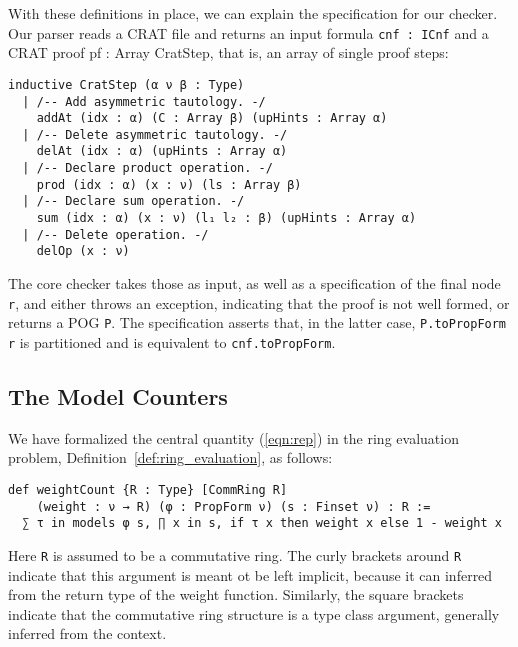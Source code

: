 With these definitions in place, we can explain the specification for our checker.
Our parser reads a CRAT file and returns an input formula \lstinline{cnf : ICnf} and a
CRAT proof {pf : Array CratStep}, that is, an array of single proof steps:
\begin{lstlisting}
inductive CratStep (α ν β : Type)
  | /-- Add asymmetric tautology. -/
    addAt (idx : α) (C : Array β) (upHints : Array α)
  | /-- Delete asymmetric tautology. -/
    delAt (idx : α) (upHints : Array α)
  | /-- Declare product operation. -/
    prod (idx : α) (x : ν) (ls : Array β)
  | /-- Declare sum operation. -/
    sum (idx : α) (x : ν) (l₁ l₂ : β) (upHints : Array α)
  | /-- Delete operation. -/
    delOp (x : ν)
\end{lstlisting}
The core checker takes those as input, as well as a specification of the final node \lstinline{r},
and either throws an exception, indicating that the proof is not well formed,
or returns a POG \lstinline{P}.
The specification asserts that, in the latter case, \lstinline{P.toPropForm r} is partitioned
and is equivalent to \lstinline{cnf.toPropForm}.

\subsection{The Model Counters}

We have formalized the central quantity (\ref{eqn:rep}) in the ring evaluation problem,
Definition~\ref{def:ring_evaluation}, as follows:
\begin{lstlisting}
def weightCount {R : Type} [CommRing R]
    (weight : ν → R) (φ : PropForm ν) (s : Finset ν) : R :=
  ∑ τ in models φ s, ∏ x in s, if τ x then weight x else 1 - weight x
\end{lstlisting}
Here \lstinline{R} is assumed to be a commutative ring. The curly brackets around \lstinline{R} indicate that
this argument is meant ot be left implicit, because it can inferred from the return type of
the weight function. Similarly, the square brackets indicate that the commutative ring structure
is a type class argument, generally inferred from the context.

